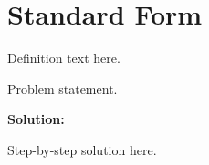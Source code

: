\section{Standard Form}


\begin{definition}[Term]
Definition text here.
\end{definition}

\begin{example}
Problem statement.

\textbf{Solution:}

Step-by-step solution here.
\end{example}
